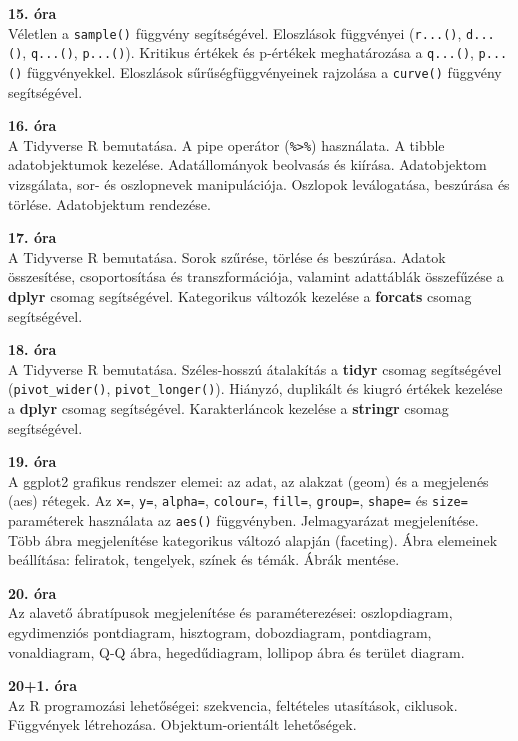 \documentclass[
]{book}
\begin{document}
\textbf{15. óra}\\
Véletlen a \texttt{sample()} függvény segítségével. Eloszlások függvényei (\texttt{r...()}, \texttt{d...()}, \texttt{q...()}, \texttt{p...()}). Kritikus értékek és p-értékek meghatározása a \texttt{q...()}, \texttt{p...()} függvényekkel. Eloszlások sűrűségfüggvényeinek rajzolása a \texttt{curve()} függvény segítségével.

\textbf{16. óra}\\
A Tidyverse R bemutatása. A pipe operátor (\texttt{\%\textgreater{}\%}) használata. A tibble adatobjektumok kezelése. Adatállományok beolvasás és kiírása. Adatobjektom vizsgálata, sor- és oszlopnevek manipulációja. Oszlopok leválogatása, beszúrása és törlése. Adatobjektum rendezése.

\textbf{17. óra}\\
A Tidyverse R bemutatása. Sorok szűrése, törlése és beszúrása. Adatok összesítése, csoportosítása és transzformációja, valamint adattáblák összefűzése a \textbf{dplyr} csomag segítségével. Kategorikus változók kezelése a \textbf{forcats} csomag segítségével.

\textbf{18. óra}\\
A Tidyverse R bemutatása. Széles-hosszú átalakítás a \textbf{tidyr} csomag segítségével (\texttt{pivot\_wider()}, \texttt{pivot\_longer()}). Hiányzó, duplikált és kiugró értékek kezelése a \textbf{dplyr} csomag segítségével. Karakterláncok kezelése a \textbf{stringr} csomag segítségével.

\textbf{19. óra}\\
A ggplot2 grafikus rendszer elemei: az adat, az alakzat (geom) és a megjelenés (aes) rétegek. Az \texttt{x=}, \texttt{y=}, \texttt{alpha=}, \texttt{colour=}, \texttt{fill=}, \texttt{group=}, \texttt{shape=} és \texttt{size=} paraméterek használata az \texttt{aes()} függvényben. Jelmagyarázat megjelenítése. Több ábra megjelenítése kategorikus változó alapján (faceting). Ábra elemeinek beállítása: feliratok, tengelyek, színek és témák. Ábrák mentése.

\textbf{20. óra}\\
Az alavető ábratípusok megjelenítése és paraméterezései: oszlopdiagram, egydimenziós pontdiagram, hisztogram, dobozdiagram, pontdiagram, vonaldiagram, Q-Q ábra, hegedűdiagram, lollipop ábra és terület diagram.

\textbf{20+1. óra}\\
Az R programozási lehetőségei: szekvencia, feltételes utasítások, ciklusok. Függvények létrehozása. Objektum-orientált lehetőségek.

  
\end{document}
